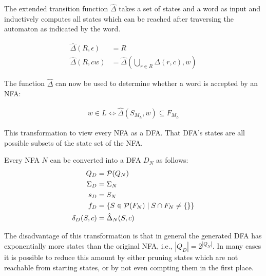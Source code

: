 \begin{definition}
    The extended transition function $\hat\Delta$ takes a set of states and a
    word as input and inductively computes all states which can be reached
    after traversing the automaton as indicated by the word.

    \begin{align}
        \hat\Delta(R, \epsilon) &= R \\
        \hat\Delta(R, c w) &= \hat\Delta(\bigcup\limits_{r \in R} \Delta(r, c), w)
    \end{align}
\end{definition}

The function $\hat\Delta$ can now be used to determine whether a word is accepted by an NFA:

\begin{align}
    w \in L \Leftrightarrow \hat\Delta(S_{M_L}, w) \subseteq F_{M_L}
\end{align}

This transformation to view every NFA as a DFA.
That DFA's states are all possible subsets of the state set of the NFA.

\begin{definition}
    Every NFA $N$ can be converted into a DFA $D_N$ as follows:
    \begin{align}
        Q_D &= \mathcal{P}(Q_N) \\
        \Sigma_D &= \Sigma_N \\
        s_D &= S_N \\
        f_D &= \{ S \in \mathcal{P}(F_N) \mid S \cap F_N \neq \{\} \} \\
        \delta_D(S, c) &= \hat\Delta_N(S, c)
    \end{align}
\end{definition}

The disadvantage of this transformation is that in general the generated DFA
has exponentially more states than the original NFA, i.e., $|Q_D| = 2^{|Q_N|}$.
In many cases it is possible to reduce this amount by either pruning states
which are not reachable from starting states, or by not even compting them in the first place.
